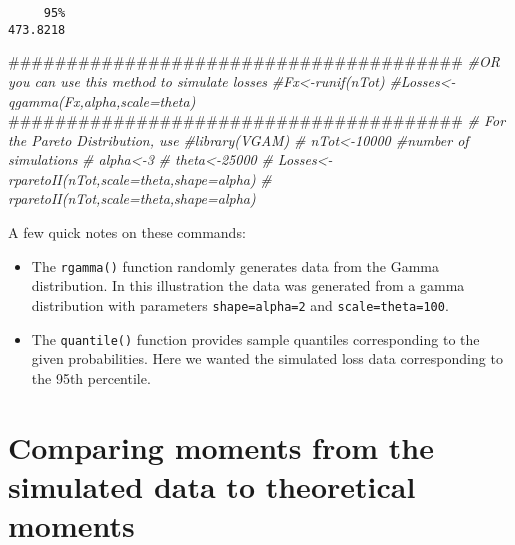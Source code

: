 \documentclass[]{book}
\newenvironment{Shaded}{\begin{snugshade}}{\end{snugshade}}
\newcommand{\CommentTok}[1]{\textcolor[rgb]{0.56,0.35,0.01}{\textit{#1}}}
\newcommand{\NormalTok}[1]{#1}
\providecommand{\tightlist}{%
  \setlength{\itemsep}{0pt}\setlength{\parskip}{0pt}}
\theoremstyle{definition}
\theoremstyle{definition}
\theoremstyle{definition}
\theoremstyle{remark}
\begin{document}
\begin{verbatim}
     95% 
473.8218 
\end{verbatim}

\begin{Shaded}
\begin{Highlighting}[]
\NormalTok{#######################################}
\CommentTok{#OR you can use this method to simulate losses }
\CommentTok{#Fx<-runif(nTot)}
\CommentTok{#Losses<-qgamma(Fx,alpha,scale=theta)}
\NormalTok{#######################################}
\CommentTok{# For the Pareto Distribution, use}
\CommentTok{#library(VGAM)}
\CommentTok{# nTot<-10000  #number of simulations}
\CommentTok{# alpha<-3}
\CommentTok{# theta<-25000}
\CommentTok{# Losses<-rparetoII(nTot,scale=theta,shape=alpha)}
\CommentTok{# rparetoII(nTot,scale=theta,shape=alpha) }
\end{Highlighting}
\end{Shaded}

A few quick notes on these commands:

\begin{itemize}
\tightlist
\item
  The \texttt{rgamma()} function randomly generates data from the Gamma
  distribution. In this illustration the data was generated from a gamma
  distribution with parameters \texttt{shape=alpha=2} and
  \texttt{scale=theta=100}.
\item
  The \texttt{quantile()} function provides sample quantiles
  corresponding to the given probabilities. Here we wanted the simulated
  loss data corresponding to the 95th percentile.
\end{itemize}

\section{Comparing moments from the simulated data to theoretical
moments}\label{comparing-moments-from-the-simulated-data-to-theoretical-moments}
\end{document}
